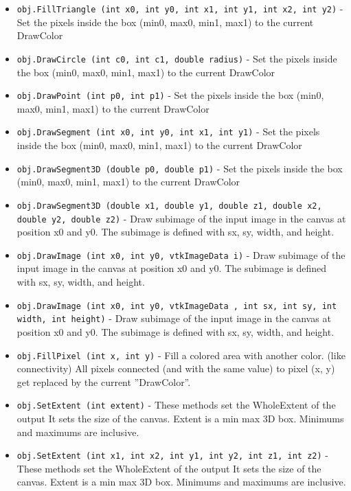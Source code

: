 \begin{itemize}
\item  \verb|obj.FillTriangle (int x0, int y0, int x1, int y1, int x2, int y2)| -  Set the pixels inside the box (min0, max0, min1, max1) to the current
 DrawColor

\item  \verb|obj.DrawCircle (int c0, int c1, double radius)| -  Set the pixels inside the box (min0, max0, min1, max1) to the current
 DrawColor

\item  \verb|obj.DrawPoint (int p0, int p1)| -  Set the pixels inside the box (min0, max0, min1, max1) to the current
 DrawColor

\item  \verb|obj.DrawSegment (int x0, int y0, int x1, int y1)| -  Set the pixels inside the box (min0, max0, min1, max1) to the current
 DrawColor

\item  \verb|obj.DrawSegment3D (double p0, double p1)| -  Set the pixels inside the box (min0, max0, min1, max1) to the current
 DrawColor

\item  \verb|obj.DrawSegment3D (double x1, double y1, double z1, double x2, double y2, double z2)| -  Draw subimage of the input image in the canvas at position x0 and
 y0. The subimage is defined with sx, sy, width, and height.

\item  \verb|obj.DrawImage (int x0, int y0, vtkImageData i)| -  Draw subimage of the input image in the canvas at position x0 and
 y0. The subimage is defined with sx, sy, width, and height.

\item  \verb|obj.DrawImage (int x0, int y0, vtkImageData , int sx, int sy, int width, int height)| -  Draw subimage of the input image in the canvas at position x0 and
 y0. The subimage is defined with sx, sy, width, and height.

\item  \verb|obj.FillPixel (int x, int y)| -  Fill a colored area with another color. (like connectivity)
 All pixels connected (and with the same value) to pixel (x, y)
 get replaced by the current ''DrawColor''.

\item  \verb|obj.SetExtent (int extent)| -  These methods set the WholeExtent of the output
 It sets the size of the canvas.
 Extent is a min max 3D box.  Minimums and maximums are inclusive.

\item  \verb|obj.SetExtent (int x1, int x2, int y1, int y2, int z1, int z2)| -  These methods set the WholeExtent of the output
 It sets the size of the canvas.
 Extent is a min max 3D box.  Minimums and maximums are inclusive.


\end{itemize}
